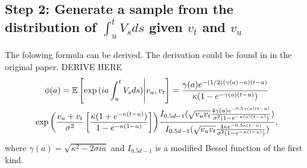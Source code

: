         \subsection*{Step 2: Generate a sample from the distribution of $\int_{u}^t V_s ds$ given $v_t$ and $v_u$}
            The folowing formula can be derived. {\color{red}The derivation could be found in in the original paper. DERIVE HERE}
            \begin{multline}
                \phi(a) = \mathbb{E}\left[  \exp{(ia\int_{u}^t V_s ds)} \Bigg| v_u, v_t\right] = \frac{\gamma(a)e^{-(1/2)(\gamma(a) - \kappa)(t - u)}}{\kappa(1-e^{-\gamma(a)(t-u)})} \\
                \exp{\left(\frac{v_u + v_t}{\sigma^2} \left[  \frac{\kappa(1+e^{-\kappa(t-u)})}{1-e^{-\kappa(1-u)}}                 \right]     \right)}
                \frac{I_{0.5d-1}(\sqrt{v_uv_t}\frac{4\gamma(a)e^{-0.5\gamma(a)(t-u)}}{\sigma^2(1-e^{-\kappa(a)(t-u)})})}{I_{0.5d-1}(\sqrt{v_uv_t}\frac{4\kappa e^{-0.5\kappa(t-u)}}{\sigma^2(1-e^{-\kappa(t-u)})})},
            \end{multline}
            where $\gamma(a) = \sqrt{\kappa^2 - 2\sigma i a}$ and $I_{0.5d-1}$ is a modified  Bessel function of the first kind.

